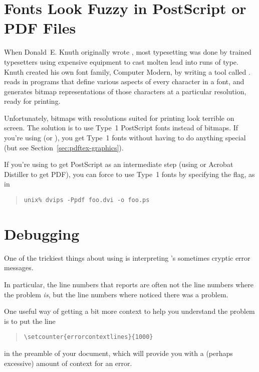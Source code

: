 \section{Fonts Look Fuzzy in PostScript or PDF Files}%
\label{sec:fuzzy-fonts}

When Donald~E. Knuth originally wrote \tex, most typesetting was done
by trained typesetters using expensive equipment to cast molten lead
into runs of type.  Knuth created his own font family, Computer
Modern, by writing a tool called \MF{}.  \MF{} reads in programs that
define various aspects of every character in a font, and generates
bitmap representations of those characters at a particular resolution,
ready for printing.

Unfortunately, bitmaps with resolutions suited for printing look
terrible on screen.  The solution is to use Type~1 PostScript fonts
instead of bitmaps. If you're using \pdftex (or \pdflatex), you get
Type~1 fonts without having to do anything special (but see
Section~\ref{sec:pdftex-graphics}).

If you're using  to get PostScript as an intermediate step
(using  or Acrobat Distiller to get PDF), you can force
 to use Type~1 fonts by specifying the  flag,
as in
\begin{quote}
\begin{verbatim}
unix% dvips -Ppdf foo.dvi -o foo.ps
\end{verbatim}
\end{quote}


\section{Debugging}

One of the trickiest things about using \latex is interpreting
\latex's sometimes cryptic error messages.

In particular, the line numbers that \latex reports are often not the
line numbers where the problem \emph{is}, but the line numbers where
\latex noticed there was a problem.

One useful way of getting a bit more context to help you understand
the problem is to put the line
\begin{quote}
\begin{verbatim}
\setcounter{errorcontextlines}{1000}
\end{verbatim}
\end{quote}
in the preamble of your document, which will provide you with a
(perhaps excessive) amount of context for an error.

